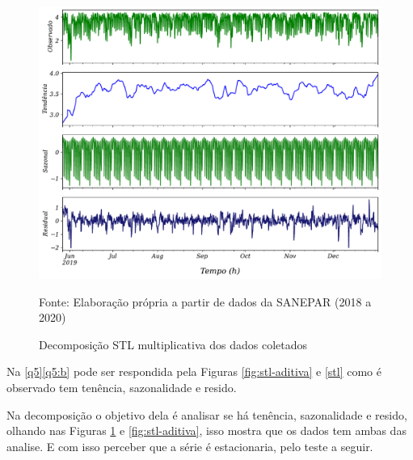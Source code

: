  
 \begin{figure}[H]
 	\centering
 	\caption{Decomposição STL multiplicativa dos dados coletados}
 	\label{fig:stl}
 	\includegraphics[width=1\linewidth]{Resultados/Figuras/STL}
 	
 	Fonte: Elaboração própria a partir de dados da SANEPAR (2018 a 2020)
 \end{figure}
 
 Na  \ref{q5}\ref{q5:b} pode ser respondida pela Figuras \ref{fig:stl-aditiva} e \ref{stl} como é observado tem tenência, sazonalidade e resido.
 
Na decomposição o objetivo dela é analisar se há tenência, sazonalidade e resido, olhando nas Figuras \ref{fig:stl} e \ref{fig:stl-aditiva}, isso mostra que os dados tem ambas das analise. E com isso perceber que a série é estacionaria, pelo teste a seguir.

